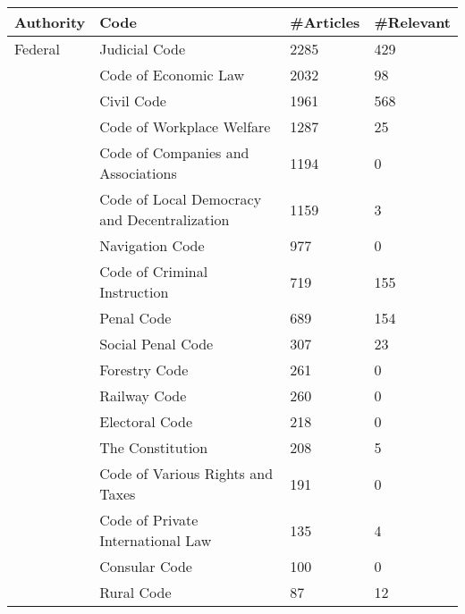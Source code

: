 \documentclass[11pt]{article}
\begin{document}
\begin{table*}[ht!]
\centering
\begin{tabular}{llll}
\hline
Authority & Code                                                & \#Articles & \#Relevant \\ \hline
Federal   & Judicial Code                                       & 2285       & 429        \\
          & Code of Economic Law                                & 2032       & 98         \\
          & Civil Code                                          & 1961       & 568        \\
          & Code of Workplace Welfare                           & 1287       & 25         \\
          & Code of Companies and Associations                  & 1194       & 0          \\
          & Code of Local Democracy and Decentralization        & 1159       & 3          \\
          & Navigation Code                                     & 977        & 0          \\
          & Code of Criminal Instruction                        & 719        & 155        \\
          & Penal Code                                          & 689        & 154        \\
          & Social Penal Code                                   & 307        & 23         \\
          & Forestry Code                                       & 261        & 0          \\
          & Railway Code                                        & 260        & 0          \\
          & Electoral Code                                      & 218        & 0          \\
          & The Constitution                                    & 208        & 5          \\
          & Code of Various Rights and Taxes                    & 191        & 0          \\
          & Code of Private International Law                   & 135        & 4          \\
          & Consular Code                                       & 100        & 0          \\
          & Rural Code                                          & 87         & 12         \\

\end{tabular}
\end{table*}
\end{document}
